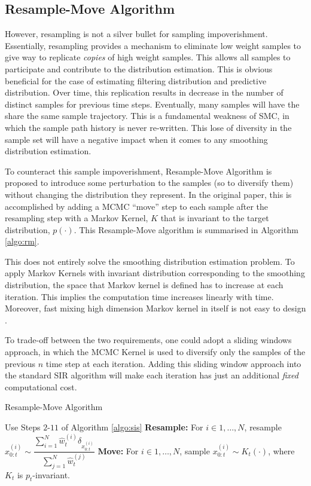 \subsection{Resample-Move Algorithm}
\label{sec:rm}
However, resampling is not a silver bullet for sampling impoverishment. Essentially, resampling provides a mechanism to eliminate low weight samples to give way to replicate \emph{copies} of high weight samples. This allows all samples to participate and contribute to the distribution estimation. This is obvious beneficial for the case of estimating filtering distribution and predictive distribution. Over time, this replication results in decrease in the number of distinct samples for previous time steps. Eventually, many samples will have the share the same sample trajectory. This is a fundamental weakness of SMC, in which the sample path history is never re-written. This lose of diversity in the sample set will have a negative impact when it comes to any smoothing distribution estimation. 

To counteract this sample impoverishment, Resample-Move Algorithm \cite{BC01, WG01} is proposed to introduce some perturbation to the samples (so to diversify them) without changing the distribution they represent. In the original paper, this is accomplished by adding a MCMC ``move'' step to each sample after the resampling step with a Markov Kernel, $K$ that is invariant to the target distribution, $p(\cdot)$. This Resample-Move algorithm is summarised in Algorithm \ref{algo:rm}.

This does not entirely solve the smoothing distribution estimation problem. To apply Markov Kernels with invariant distribution corresponding to the smoothing distribution, the space that Markov kernel is defined has to increase at each iteration. This implies the computation time increases linearly with time. Moreover, fast mixing high dimension Markov kernel in itself is not easy to design \cite{JAM10}.

To trade-off between the two requirements, one could adopt a sliding windows approach, in which the MCMC Kernel is used to diversify only the samples of the previous $n$ time step at each iteration. Adding this sliding window approach into the standard SIR algorithm will make each iteration has just an additional \emph{fixed} computational cost.

\begin{algorithm}
\caption{Resample-Move Algorithm}\label{algo:rm}
\begin{algorithmic}[1]
\State Use Steps $2$-$11$ of Algorithm \ref{algo:sis}
\State \textbf{Resample:} For $i \in 1, \ldots, N$, resample $ x^{(i)}_{0:t} \sim \dfrac{\sum^N_{i=1}\hat{w}^{(i)}_t\delta_{x^{(i)}_{0:t}}}{\sum^N_{j=1} \hat{w}^{(j)}_t}$
\State \textbf{Move:} For $i \in 1, \ldots, N$, sample $x^{(i)}_{0:t} \sim K_t(\cdot)$, where $K_t$ is $p_t$-invariant.
\EndFunction
\end{algorithmic}
\end{algorithm}

